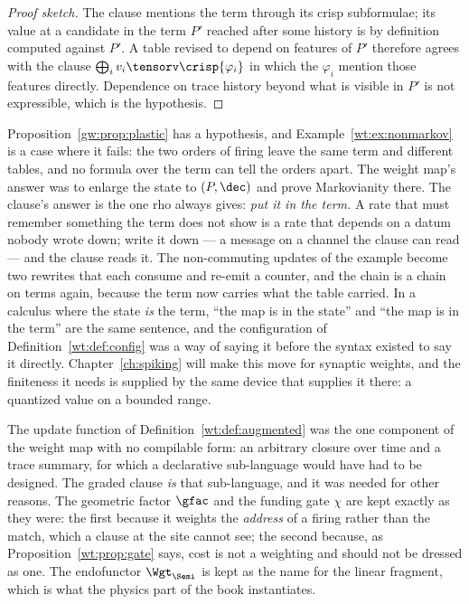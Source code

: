 \begin{proof}[Proof sketch]
The clause mentions the term through its crisp subformulae; its value at a candidate in
the term $P'$ reached after some history is by definition computed against $P'$. A table
revised to depend on features of $P'$ therefore agrees with the clause
$\bigoplus_i v_i \tensorv \crisp{\varphi_i}$ in which the $\varphi_i$ mention those
features directly. Dependence on trace history beyond what is visible in $P'$ is not
expressible, which is the hypothesis.
\end{proof}

\begin{remark}
\label{gw:rmk:state-is-term}
Proposition~\ref{gw:prop:plastic} has a hypothesis, and Example~\ref{wt:ex:nonmarkov}
is a case where it fails: the two orders of firing leave the same term and different
tables, and no formula over the term can tell the orders apart. The weight map's answer
was to enlarge the state to $(P,\dec)$ and prove Markovianity there. The clause's answer
is the one rho always gives: \emph{put it in the term.} A rate that must remember something
the term does not show is a rate that depends on a datum nobody wrote down; write it down
--- a message on a channel the clause can read --- and the clause reads it. The
non-commuting updates of the example become two rewrites that each consume and re-emit a
counter, and the chain is a chain on terms again, because the term now carries what the
table carried. In a calculus where the state \emph{is} the term, ``the map is in the
state'' and ``the map is in the term'' are the same sentence, and the configuration of
Definition~\ref{wt:def:config} was a way of saying it before the syntax existed to say it
directly. Chapter~\ref{ch:spiking} will make this move for synaptic weights, and the
finiteness it needs is supplied by the same device that supplies it there: a quantized
value on a bounded range.
\end{remark}

\begin{remark}
\label{gw:rmk:retired}
The update function of Definition~\ref{wt:def:augmented} was the one component of the
weight map with no compilable form: an arbitrary closure over time and a trace summary,
for which a declarative sub-language would have had to be designed. The graded clause
\emph{is} that sub-language, and it was needed for other reasons. The geometric factor
$\gfac$ and the funding gate $\chi$ are kept exactly as they were: the first because it
weights the \emph{address} of a firing rather than the match, which a clause at the site
cannot see; the second because, as Proposition~\ref{wt:prop:gate} says, cost is not a
weighting and should not be dressed as one. The endofunctor $\Wgt_{\Semi}$ is kept as the
name for the linear fragment, which is what the physics part of the book instantiates.
\end{remark}

